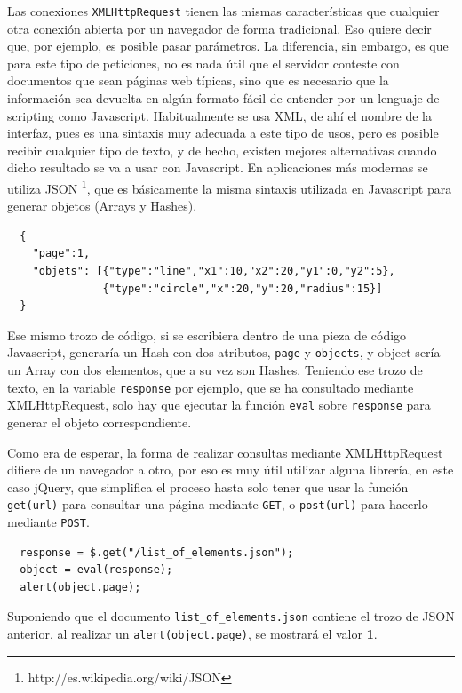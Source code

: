 Las conexiones \texttt{XMLHttpRequest} tienen las mismas características que cualquier otra conexión abierta por un navegador de forma tradicional. Eso quiere decir que, por ejemplo, es posible pasar parámetros. La diferencia, sin embargo, es que para este tipo de peticiones, no es nada útil que el servidor conteste con documentos que sean páginas web típicas, sino que es necesario que la información sea devuelta en algún formato fácil de entender por un lenguaje de scripting como Javascript. Habitualmente se usa XML, de ahí el nombre de la interfaz, pues es una sintaxis muy adecuada a este tipo de usos, pero es posible recibir cualquier tipo de texto, y de hecho, existen mejores alternativas cuando dicho resultado se va a usar con Javascript. En aplicaciones más modernas se utiliza JSON \footnote{http://es.wikipedia.org/wiki/JSON}, que es básicamente la misma sintaxis utilizada en Javascript para generar objetos (Arrays y Hashes).

\begin{verbatim}
  {
    "page":1,
    "objets": [{"type":"line","x1":10,"x2":20,"y1":0,"y2":5},
               {"type":"circle","x":20,"y":20,"radius":15}]
  }
\end{verbatim}

Ese mismo trozo de código, si se escribiera dentro de una pieza de código Javascript, generaría un Hash con dos atributos, \texttt{page} y \texttt{objects}, y object sería un Array con dos elementos, que a su vez son Hashes. Teniendo ese trozo de texto, en la variable \texttt{response} por ejemplo, que se ha consultado mediante XMLHttpRequest, solo hay que ejecutar la función \texttt{eval} sobre \texttt{response} para generar el objeto correspondiente.

Como era de esperar, la forma de realizar consultas mediante XMLHttpRequest difiere de un navegador a otro, por eso es muy útil utilizar alguna librería, en este caso jQuery, que simplifica el proceso hasta solo tener que usar la función \texttt{get(url)} para consultar una página mediante \texttt{GET}, o \texttt{post(url)} para hacerlo mediante \texttt{POST}.

\begin{verbatim}
  response = $.get("/list_of_elements.json");
  object = eval(response);
  alert(object.page);
\end{verbatim}

Suponiendo que el documento \texttt{list\_of\_elements.json} contiene el trozo de JSON anterior, al realizar un \texttt{alert(object.page)}, se mostrará el valor \textbf{1}.

